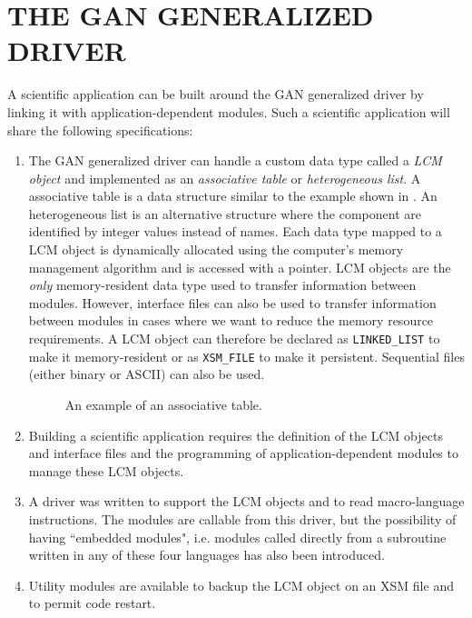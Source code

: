\section{THE GAN GENERALIZED DRIVER}

A scientific application can be built around the GAN generalized driver by
linking it with application-dependent modules. Such a
scientific application will share the following specifications:

\begin{enumerate}

\item  The GAN generalized driver can handle a custom data type called a {\sl LCM object}
and implemented as an {\sl associative table} or {\sl heterogeneous list}. A associative
table is a data structure similar to the example shown in . An heterogeneous list
is an alternative structure where the component are identified by integer values instead of names. Each
data type mapped to a LCM object is dynamically
allocated using the computer's memory management algorithm and is accessed with
a pointer. LCM objects are the {\sl only} memory-resident data type used to
transfer information between modules. However, interface files can also be used to transfer information
between modules in cases where we want to reduce the memory resource
requirements. A LCM object can therefore be declared as {\tt LINKED\_LIST} to make it
memory-resident or as {\tt XSM\_FILE} to make it persistent. Sequential files (either
binary or ASCII) can also be used.

\begin{figure}[h!]
\begin{center} 
\epsfxsize=7cm \centerline{ }
\parbox{14.0cm}{\caption{An example of an associative table.}\label{fig:LkList}}   
\end{center}  
\end{figure}

\item  Building a scientific application requires the definition of the LCM
objects and interface files and the programming of application-dependent modules
to manage these LCM objects.

\item  A driver was written to support the LCM objects and to read
macro-language instructions. The modules are callable from this driver, but  the
possibility of having ``embedded modules", i.e.  modules called directly from a
subroutine written in any of these four languages has also been introduced.

\item  Utility modules are available to backup the LCM object on an XSM
file and to permit code restart.

\end{enumerate}

